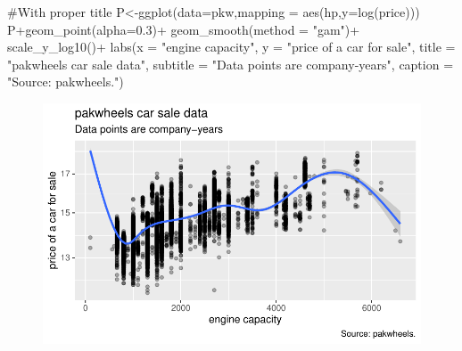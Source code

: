 \documentclass[
  letterpaper,
  DIV=11,
  numbers=noendperiod]{scrartcl}
\newenvironment{Shaded}{\begin{snugshade}}{\end{snugshade}}
\newcommand{\AttributeTok}[1]{\textcolor[rgb]{0.40,0.45,0.13}{#1}}
\newcommand{\CommentTok}[1]{\textcolor[rgb]{0.37,0.37,0.37}{#1}}
\newcommand{\FloatTok}[1]{\textcolor[rgb]{0.68,0.00,0.00}{#1}}
\newcommand{\FunctionTok}[1]{\textcolor[rgb]{0.28,0.35,0.67}{#1}}
\newcommand{\NormalTok}[1]{\textcolor[rgb]{0.00,0.23,0.31}{#1}}
\newcommand{\OtherTok}[1]{\textcolor[rgb]{0.00,0.23,0.31}{#1}}
\newcommand{\SpecialCharTok}[1]{\textcolor[rgb]{0.37,0.37,0.37}{#1}}
\newcommand{\StringTok}[1]{\textcolor[rgb]{0.13,0.47,0.30}{#1}}
\begin{document}
\begin{Shaded}
\begin{Highlighting}[]
\CommentTok{\#With proper title}
\NormalTok{P}\OtherTok{\textless{}{-}}\FunctionTok{ggplot}\NormalTok{(}\AttributeTok{data=}\NormalTok{pkw,}\AttributeTok{mapping =} \FunctionTok{aes}\NormalTok{(hp,}\AttributeTok{y=}\FunctionTok{log}\NormalTok{(price)))}
\NormalTok{P}\SpecialCharTok{+}\FunctionTok{geom\_point}\NormalTok{(}\AttributeTok{alpha=}\FloatTok{0.3}\NormalTok{)}\SpecialCharTok{+}
  \FunctionTok{geom\_smooth}\NormalTok{(}\AttributeTok{method =} \StringTok{"gam"}\NormalTok{)}\SpecialCharTok{+}
  \FunctionTok{scale\_y\_log10}\NormalTok{()}\SpecialCharTok{+}
  \FunctionTok{labs}\NormalTok{(}\AttributeTok{x =} \StringTok{"engine capacity"}\NormalTok{, }\AttributeTok{y =} \StringTok{"price of a car for sale"}\NormalTok{,}
       \AttributeTok{title =} \StringTok{"pakwheels car sale data"}\NormalTok{,}
       \AttributeTok{subtitle =} \StringTok{"Data points are company{-}years"}\NormalTok{,}
       \AttributeTok{caption =} \StringTok{"Source: pakwheels."}\NormalTok{)}
\end{Highlighting}
\end{Shaded}

\begin{figure}[H]

{\centering \includegraphics[width=17.1875in,height=\textheight]{pakwheels_files/figure-pdf/unnamed-chunk-32-1.pdf}

}

\end{figure}

\hypertarget{section-6}{%
\subsection{}\label{section-6}}
\end{document}
